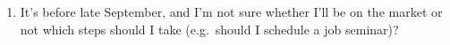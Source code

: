 \documentclass{\classes/econtex}
\begin{document}
\begin{enumerate}
\begin{quote}
\begin{comment}
      The resolution (subsequently clarified in emails on 2006-10-18 and
      2006-10-19 and an email to Zhou Lu on 2006-10-19 from CDC) was as
      follows.

      Our declared public policy (see the graduate \href{handbook}{http://www.econ2.jhu.edu/pdf/Econ_Grad_Handbook.pdf}) is that nobody can enroll for a 7th year
      in the program.  In practice, if in the opinion of an advisor and
      second advisor, a student's dissertation is essentially complete as
      of August of the 6th year, we may relax this rigor slightly in order
      to arrange a defense and final ``cleaning up'' of details - but \textit{  only} in the case where the dissertation is in all essentials
      complete.

      So, an important real and psychological point here is that failure
      to be included in the official list of candidates is almost (but not
      quite) equivalent to the end of all hope of obtaining a JHU PhD.  If
      a student uses wisely the time freed up by not participating in the
      job market to conduct an intense burst of high quality research, it
      is in principle quite possible that they will finish a dissertation
      despite their prior lack of progress.  The exclusion from the job
      market process may concentrate their minds in a way that has not
      happened before.

      Furthermore, if their dissertation defense occurs before the
      deadline for the `on-the-market' decision in the following year (mid
      October), the student can apply to jobs themselves (with the usual
      process, including advisors writing letters and giving them to the
      \JMStaff, etc), but without their name being officially
      included in list of `on-the-market' students.  They can also have a page on the dept
      website to which they can refer employers, but will not be included
      in the list of students ``on the market'' clickable from the main
      dept web page.  The
      situation will be explained candidly to employers as resulting from
      our inflexible rule that students must be on the market in their 6th
      year or earlier.  This is what we did with Farhan Hameed this year,
      and he did eventually get a couple of mediocre job offers, one of
      which he has accepted.

    \end{comment}


  \end{quote}
\item It's before late September, and I'm not sure whether I'll be on the market or not which steps should I take (e.g.\ should I schedule a job seminar)?


\end{enumerate}
\end{document}
